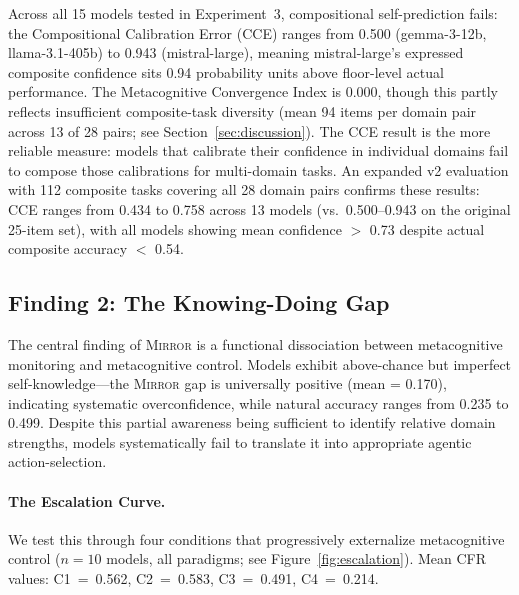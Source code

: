 \documentclass[10pt]{article}
\newcommand{\mirror}{\textsc{Mirror}}
\newcommand{\CCE}{CCE}
\newcommand{\CFR}{CFR}
\begin{document}
Across all 15 models tested in Experiment~3, compositional self-prediction fails:
the Compositional Calibration Error (\CCE{}) ranges from 0.500 (gemma-3-12b,
llama-3.1-405b) to 0.943 (mistral-large), meaning mistral-large's expressed
composite confidence sits 0.94 probability units above floor-level actual
performance. The Metacognitive Convergence Index is 0.000, though this partly
reflects insufficient composite-task diversity (mean 94 items per domain pair
across 13 of 28 pairs; see Section~\ref{sec:discussion}). The \CCE{} result is the more reliable measure: models that calibrate their
confidence in individual domains fail to compose those calibrations for
multi-domain tasks. An expanded v2 evaluation with 112 composite tasks covering all 28 domain pairs
confirms these results: CCE ranges from 0.434 to 0.758 across 13 models (vs.\
0.500--0.943 on the original 25-item set), with all models showing mean
confidence $>$ 0.73 despite actual composite accuracy $<$ 0.54.

\subsection{Finding 2: The Knowing-Doing Gap}

The central finding of \mirror{} is a functional dissociation between metacognitive
monitoring and metacognitive control. Models exhibit above-chance but imperfect self-knowledge---the \mirror{} gap is
universally positive (mean = 0.170), indicating systematic overconfidence, while
natural accuracy ranges from 0.235 to 0.499. Despite this partial awareness being
sufficient to identify relative domain strengths, models systematically fail to
translate it into appropriate agentic action-selection.

\paragraph{The Escalation Curve.}
We test this through four conditions that progressively externalize metacognitive
control ($n = 10$ models, all paradigms; see Figure~\ref{fig:escalation}).
Mean \CFR{} values: C1~=~0.562, C2~=~0.583, C3~=~0.491, C4~=~0.214.
\end{document}
